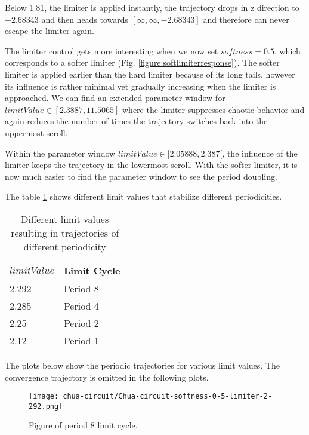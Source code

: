 \documentclass[main]{subfiles}
\begin{document}
Below 1.81, the limiter is applied instantly, the trajectory drops in z direction to \(-2.68343\) and then heads towards \([\infty,\infty,-2.68343]\) and therefore can never escape the limiter again.


The limiter control gets more interesting when we now set \(softness=0.5\), which corresponds to a softer limiter (Fig. \ref{figure:softlimiterresponse}). The softer limiter is applied earlier than the hard limiter because of its long tails, however its influence is rather minimal yet gradually increasing when the limiter is approached. We can find an extended parameter window for \(limitValue \in [2.3887,11.5065]\) where the limiter suppresses chaotic behavior and again reduces the number of times the trajectory switches back into the uppermost scroll.

Within the parameter window \(limitValue \in [2.05888,2.387[\), the influence of the limiter keeps the trajectory in the lowermost scroll. With the softer limiter, it is now much easier to find the parameter window to see the period doubling. 

The table \ref{table:periodicities} shows different limit values that stabilize different periodicities.

\begin{table}[H]
\renewcommand{\arraystretch}{1.2}
\center
\begin{tabular}{@{}ll@{}}
	\toprule
   \(limitValue\) & Limit Cycle\\
   \midrule
   2.292 & Period 8 \\ 
   2.285 & Period 4 \\
   2.25  & Period 2 \\
   2.12 & Period 1 \\
   \bottomrule
\end{tabular}
\caption{Different limit values resulting in trajectories of different periodicity}
\label{table:periodicities}
\end{table}

The plots below show the periodic trajectories for various limit values. The convergence trajectory is omitted in the following plots.


\begin{figure}[H]
\centering
\texttt{[image: chua-circuit/Chua-circuit-softness-0-5-limiter-2-292.png]}
\caption[Figure of period 8 limit cycle]{Figure of period 8 limit cycle.}
\label{figure:chaotictrajectories}
\end{figure}
\end{document}
